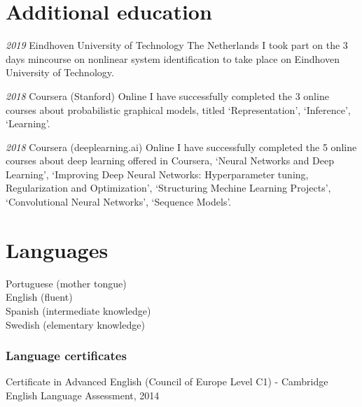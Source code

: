 \documentclass[10pt,letterpaper]{article} %
\begin{document}
\section*{Additional education}


    {\em  2019 }
    { Eindhoven University of Technology }
    { The Netherlands }
    { I took part on the 3 days mincourse on nonlinear system identification to take place on Eindhoven University of Technology. }

    {\em  2018 }
    { Coursera (Stanford) }
    { Online }
    { I have successfully completed the 3 online courses about probabilistic graphical models, titled `Representation', `Inference', `Learning'. }

    {\em  2018 }
    { Coursera (deeplearning.ai) }
    { Online }
    { I have successfully completed the 5 online courses about deep learning offered in Coursera, `Neural Networks and Deep Learning', `Improving Deep Neural Networks: Hyperparameter tuning, Regularization and Optimization', `Structuring Mechine Learning Projects', `Convolutional Neural Networks', `Sequence Models'. }


\section*{Languages}

Portuguese (mother tongue)\\
English (fluent)\\
Spanish (intermediate knowledge)\\
Swedish (elementary knowledge)

\subsubsection*{Language certificates}

Certificate in Advanced English (Council of Europe Level C1) - Cambridge English Language Assessment, 2014
\end{document}
